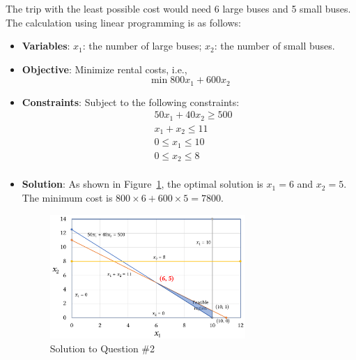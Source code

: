 \documentclass[conference]{styles/acmsiggraph}
\begin{document}
The trip with the least possible cost would need 6 large buses and 5 small buses.
The calculation using linear programming is as follows:
\begin{itemize}[leftmargin=*]
	\setlength{\itemsep}{0pt}
	\setlength{\parsep}{0pt}
	\setlength{\parskip}{0pt}
	\item \textbf{Variables}: $x_1$: the number of large buses; $x_2$: the number of small buses.
	\item \textbf{Objective}: Minimize rental costs, i.e.,
	\begin{equation}
		\min 800x_1 + 600 x_2
	\end{equation}
	\item \textbf{Constraints}: Subject to the following constraints:
	\begin{equation}
		\begin{aligned}
			& 50x_1 + 40x_2 \geq 500 \\
			& x_1 + x_2 \leq 11 \\
			& 0 \leq x_1 \leq 10 \\
			& 0 \leq x_2 \leq 8 \\
		\end{aligned}
	\end{equation}
	\item \textbf{Solution}: As shown in Figure~\ref{fig:2}, the optimal solution is $x_1 = 6$ and $x_2 = 5$. The minimum cost is $800 \times 6 + 600 \times 5 = 7800$.
	\begin{figure}[!h]
		\centering
		\includegraphics[width=0.7\textwidth]{figures/q2.pdf}
		\caption{Solution to Question \#2}
		\label{fig:2}
	\end{figure}
\end{itemize}
\end{document}
